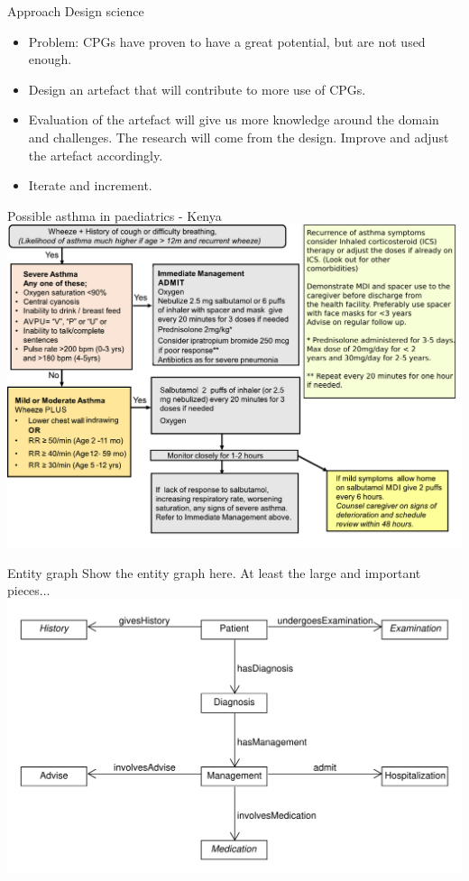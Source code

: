 \documentclass{beamer}
\begin{document}
\begin{frame}{Approach}
Design science
\begin{itemize}
	\item Problem: CPGs have proven to have a great potential, but are not used enough.
	\item Design an artefact that will contribute to more use of CPGs.
	\item Evaluation of the artefact will give us more knowledge around the domain and challenges. The research will come from the design. Improve and adjust the artefact accordingly. 
	\item Iterate and increment.
\end{itemize}
\end{frame}

\begin{frame}{Possible asthma in paediatrics - Kenya}
\includegraphics[scale=0.45]{KenyaCPG}
\end{frame}


\begin{frame}{Entity graph}
Show the entity graph here. At least the large and important pieces...
\includegraphics[scale=0.45]{SimpleEntityGraph}
\end{frame}
\end{document}
